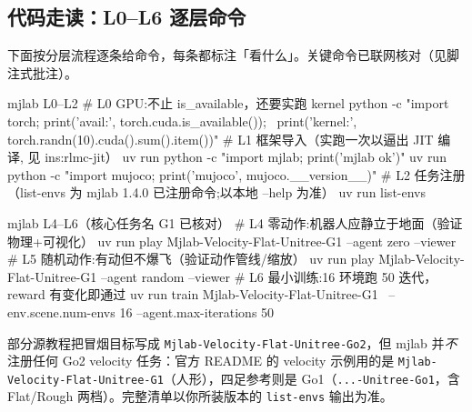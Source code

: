 
\subsection{代码走读：L0--L6 逐层命令}

下面按分层流程逐条给命令，每条都标注「看什么」。关键命令已联网核对（见脚注式批注）。

\begin{codebox}[bash]{mjlab L0--L2}
# L0 GPU:不止 is_available，还要实跑 kernel
python -c "import torch; print('avail:', torch.cuda.is_available()); \
           print('kernel:', torch.randn(10).cuda().sum().item())"
# L1 框架导入（实跑一次以逼出 JIT 编译, 见 ins:rlmc-jit）
uv run python -c "import mjlab; print('mjlab ok')"
uv run python -c "import mujoco; print('mujoco', mujoco.__version__)"
# L2 任务注册（list-envs 为 mjlab 1.4.0 已注册命令;以本地 --help 为准）
uv run list-envs
\end{codebox}

\begin{codebox}[bash]{mjlab L4--L6（核心任务名 G1 已核对）}
# L4 零动作:机器人应静立于地面（验证物理+可视化）
uv run play Mjlab-Velocity-Flat-Unitree-G1 --agent zero --viewer
# L5 随机动作:有动但不爆飞（验证动作管线/缩放）
uv run play Mjlab-Velocity-Flat-Unitree-G1 --agent random --viewer
# L6 最小训练:16 环境跑 50 迭代，reward 有变化即通过
uv run train Mjlab-Velocity-Flat-Unitree-G1 \
    --env.scene.num-envs 16 --agent.max-iterations 50
\end{codebox}
部分源教程把冒烟目标写成 \texttt{Mjlab-Velocity-Flat-Unitree-Go2}，但 mjlab 并\emph{不}注册任何 Go2 velocity 任务：官方 README 的 velocity 示例用的是 \texttt{Mjlab-Velocity-Flat-Unitree-G1}（人形），四足参考则是 Go1（\texttt{...-Unitree-Go1}，含 Flat/Rough 两档）。完整清单以你所装版本的 \texttt{list-envs} 输出为准。

